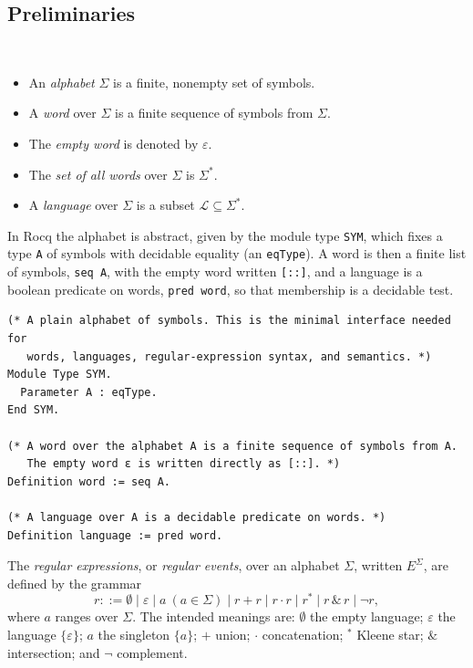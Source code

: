 \subsection{Preliminaries}\label{sec:prelim}

\begin{definition}
\mbox{}\\[-0.5em]
\begin{itemize}
    \item An \emph{alphabet} $\Sigma$ is a finite, nonempty set of symbols.
    \item A \emph{word} over $\Sigma$ is a finite sequence of symbols from $\Sigma$.
    \item The \emph{empty word} is denoted by $\varepsilon$.
    \item The \emph{set of all words} over $\Sigma$ is $\Sigma^*$.
    \item A \emph{language} over $\Sigma$ is a subset $\mathcal{L} \subseteq \Sigma^*$.
\end{itemize}
\end{definition}

In Rocq the alphabet is abstract, given by the module type \texttt{SYM}, which
fixes a type \texttt{A} of symbols with decidable equality (an \texttt{eqType}). A
word is then a finite list of symbols, \texttt{seq A}, with the empty word written
\texttt{[::]}, and a language is a boolean predicate on words, \texttt{pred word},
so that membership is a decidable test.

\begin{lstlisting}[style=rocqstyle,caption={Alphabet, words, and languages (\texttt{Alphabet.v}, \texttt{Languages.v}).},label={lst:words}]
(* A plain alphabet of symbols. This is the minimal interface needed for
   words, languages, regular-expression syntax, and semantics. *)
Module Type SYM.
  Parameter A : eqType.
End SYM.

(* A word over the alphabet A is a finite sequence of symbols from A.
   The empty word ε is written directly as [::]. *)
Definition word := seq A.

(* A language over A is a decidable predicate on words. *)
Definition language := pred word.
\end{lstlisting}

\begin{definition}
The \emph{regular expressions}, or \emph{regular events}, over an alphabet
$\Sigma$, written $E^{\Sigma}$, are defined by the grammar
\[
  r ::= \emptyset \mid \varepsilon \mid a\ (a \in \Sigma)
        \mid r+r \mid r\cdot r \mid r^* \mid r \,\&\, r \mid \neg r,
\]
where $a$ ranges over $\Sigma$. The intended meanings are: $\emptyset$ the empty
language; $\varepsilon$ the language $\{\varepsilon\}$; $a$ the singleton $\{a\}$;
$+$ union; $\cdot$ concatenation; ${}^{*}$ Kleene star; $\&$ intersection; and
$\neg$ complement.
\end{definition}

